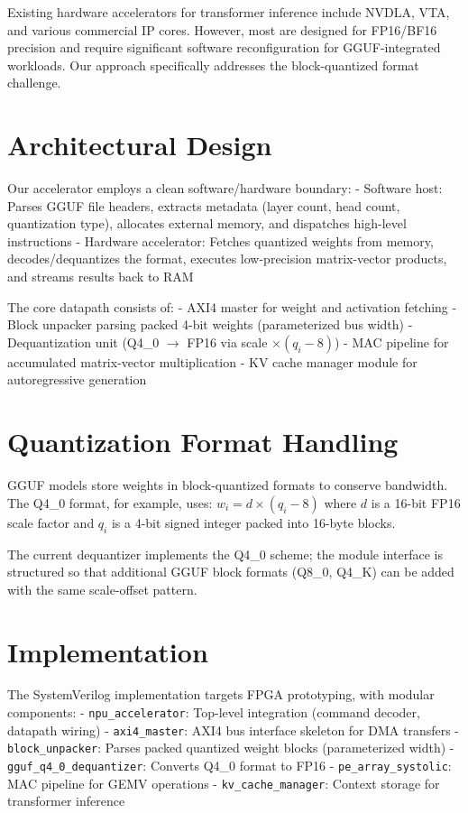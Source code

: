 \documentclass[12pt, conference]{ieeeconf}
\begin{document}
Existing hardware accelerators for transformer inference include NVDLA, VTA, and various commercial IP cores. However, most are designed for FP16/BF16 precision and require significant software reconfiguration for GGUF-integrated workloads. Our approach specifically addresses the block-quantized format challenge.

\section{Architectural Design}

Our accelerator employs a clean software/hardware boundary:
- Software host: Parses GGUF file headers, extracts metadata (layer count, head count, quantization type), allocates external memory, and dispatches high-level instructions
- Hardware accelerator: Fetches quantized weights from memory, decodes/dequantizes the format, executes low-precision matrix-vector products, and streams results back to RAM

The core datapath consists of:
- AXI4 master for weight and activation fetching
- Block unpacker parsing packed 4-bit weights (parameterized bus width)
- Dequantization unit (Q4\_0 $\rightarrow$ FP16 via scale $\times (q_i - 8)$)
- MAC pipeline for accumulated matrix-vector multiplication
- KV cache manager module for autoregressive generation

\section{Quantization Format Handling}

GGUF models store weights in block-quantized formats to conserve bandwidth. The Q4\_0 format, for example, uses:
$w_i = d \times (q_i - 8)$
where $d$ is a 16-bit FP16 scale factor and $q_i$ is a 4-bit signed integer packed into 16-byte blocks.

The current dequantizer implements the Q4_0 scheme; the module interface is structured so that additional GGUF block formats (Q8\_0, Q4\_K) can be added with the same scale-offset pattern.

\section{Implementation}

The SystemVerilog implementation targets FPGA prototyping, with modular components:
- \texttt{npu\_accelerator}: Top-level integration (command decoder, datapath wiring)
- \texttt{axi4\_master}: AXI4 bus interface skeleton for DMA transfers
- \texttt{block\_unpacker}: Parses packed quantized weight blocks (parameterized width)
- \texttt{gguf\_q4\_0\_dequantizer}: Converts Q4\_0 format to FP16
- \texttt{pe\_array\_systolic}: MAC pipeline for GEMV operations
- \texttt{kv\_cache\_manager}: Context storage for transformer inference
\end{document}

